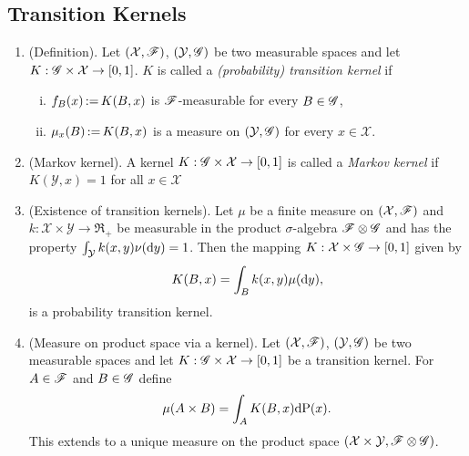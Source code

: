 \documentclass[a4paper,10pt]{article}
\begin{document}
\subsection{Transition Kernels}\label{sec:transition_kernel}
\begin{enumerate}
 \item (Definition). Let $(\mathcal{X},\mathscr{F})$, $(\mathcal{Y},\mathscr{G})$ be two measurable spaces and let $K:\mathscr{G}\times \mathcal{X}\to [0,1]$.
       $K$ is called a \textit{(probability) transition kernel} if
       \begin{enumerate}[i.]
        \item $f_B(x) {}\mathop{\mathrel{:}=}{} K(B,x)$ is $\mathscr{F}$-measurable for every $B\in\mathscr{G}$,
        \item $\mu_x(B) {}\mathop{\mathrel{:}=}{} K(B,x)$ is a measure on $(\mathcal{Y},\mathscr{G})$ for every $x\in \mathcal{X}$.
       \end{enumerate}
 \item (Markov kernel). A kernel $K:\mathscr{G}\times \mathcal{X}\to [0,1]$ is called a \textit{Markov kernel} if 
       $K(\mathcal{Y}, x)=1$ for all $x\in\mathcal{X}$
 \item (Existence of transition kernels). Let $\mu$ be a finite measure on 
       $(\mathcal{X},\mathscr{F})$ and $k:\mathcal{X}\times \mathcal{Y}\to\Re_+$
       be measurable in the product $\sigma$-algebra $\mathscr{F}\otimes \mathscr{G}$ and has the property $\int_{\mathcal{Y}} k(x,y)\nu(\mathrm{d} y)=1$. Then
       the mapping $K:\mathcal{X} \times \mathscr{G} \to [0,1]$ given by
       \[
        K(B,x) = \int_B k(x,y) \mu(\mathrm{d} y),
       \]
       is a probability transition kernel.
 \item (Measure on product space via a kernel). 
       Let $(\mathcal{X},\mathscr{F})$, $(\mathcal{Y},\mathscr{G})$ be two measurable spaces and let $K:\mathscr{G}\times\mathcal{X}\to [0,1]$
       be a transition kernel. For $A\in\mathscr{F}$ and $B\in\mathscr{G}$ define 
       \[
        \mu(A\times B) = \int_A K(B,x)\mathrm{d}\mathrm{P}(x).
       \]
       This extends to a unique measure on the product space $(\mathcal{X}\times\mathcal{Y}, \mathscr{F}\otimes\mathscr{G})$.
\end{enumerate}
\end{document}
